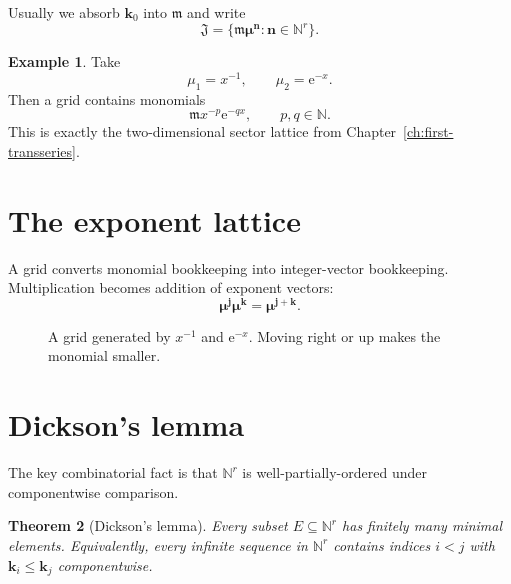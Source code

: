 \documentclass[11pt,oneside]{book}
\newtheorem{theorem}{Theorem}[chapter]
\theoremstyle{definition}
\newtheorem{example}[theorem]{Example}
\theoremstyle{remark}
\newcommand{\N}{\mathbb{N}}
\newcommand{\m}{\mathfrak{m}}
\newcommand{\e}{\mathrm{e}}
\begin{document}
Usually we absorb $\bm k_0$ into $\m$ and write
\[
  \mathfrak{J}=\{\m\boldsymbol\mu^{\bm n}:\bm n\in\N^r\}.
\]

\begin{example}
Take
\[
  \mu_1=x^{-1},\qquad \mu_2=\e^{-x}.
\]
Then a grid contains monomials
\[
  \m x^{-p}\e^{-qx},\qquad p,q\in\N.
\]
This is exactly the two-dimensional sector lattice from
Chapter~\ref{ch:first-transseries}.
\end{example}

\section{The exponent lattice}

A grid converts monomial bookkeeping into integer-vector bookkeeping.
Multiplication becomes addition of exponent vectors:
\[
  \boldsymbol\mu^{\bm j}\boldsymbol\mu^{\bm k}
  =\boldsymbol\mu^{\bm j+\bm k}.
\]

\begin{figure}[ht]
\centering
{}
\caption{A grid generated by $x^{-1}$ and $\e^{-x}$. Moving right or up makes the monomial smaller.}
\label{fig:grid-lattice}
\end{figure}

\section{Dickson's lemma}

The key combinatorial fact is that $\N^r$ is well-partially-ordered under
componentwise comparison.

\begin{theorem}[Dickson's lemma]
Every subset $E\subseteq\N^r$ has finitely many minimal elements. Equivalently,
every infinite sequence in $\N^r$ contains indices $i<j$ with
$\bm k_i\le\bm k_j$ componentwise.
\end{theorem}
\end{document}
